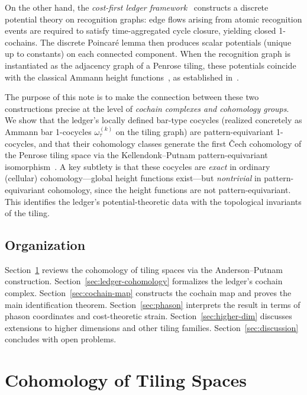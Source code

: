 \documentclass[12pt]{article}
\theoremstyle{definition}
\theoremstyle{remark}
\begin{document}
On the other hand, the \emph{cost-first ledger framework}~\cite{PardoGuerraEtAl2026} constructs a discrete potential theory on recognition graphs: edge flows arising from atomic recognition events are required to satisfy time-aggregated cycle closure, yielding closed 1-cochains. The discrete Poincar\'{e} lemma then produces scalar potentials (unique up to constants) on each connected component. When the recognition graph is instantiated as the adjacency graph of a Penrose tiling, these potentials coincide with the classical Ammann height functions~\cite{GrunbaumShephard1987,BaakeGrimm2013}, as established in~\cite{PardoGuerraGolden2026}.

The purpose of this note is to make the connection between these two constructions precise at the level of \emph{cochain complexes and cohomology groups}. We show that the ledger's locally defined bar-type cocycles (realized concretely as Ammann bar 1-cocycles $\omega_\tau^{(k)}$ on the tiling graph) are pattern-equivariant 1-cocycles, and that their cohomology classes generate the first \v{C}ech cohomology of the Penrose tiling space via the Kellendonk--Putnam pattern-equivariant isomorphism~\cite{KellendonkPutnam2006}. A key subtlety is that these cocycles are \emph{exact} in ordinary (cellular) cohomology---global height functions exist---but \emph{nontrivial} in pattern-equivariant cohomology, since the height functions are not pattern-equivariant. This identifies the ledger's potential-theoretic data with the topological invariants of the tiling.

\subsection{Organization}
Section~\ref{sec:tiling-cohomology} reviews the cohomology of tiling spaces via the Anderson--Putnam construction. Section~\ref{sec:ledger-cohomology} formalizes the ledger's cochain complex. Section~\ref{sec:cochain-map} constructs the cochain map and proves the main identification theorem. Section~\ref{sec:phason} interprets the result in terms of phason coordinates and cost-theoretic strain. Section~\ref{sec:higher-dim} discusses extensions to higher dimensions and other tiling families. Section~\ref{sec:discussion} concludes with open problems.

\section{Cohomology of Tiling Spaces}
\label{sec:tiling-cohomology}
\end{document}
